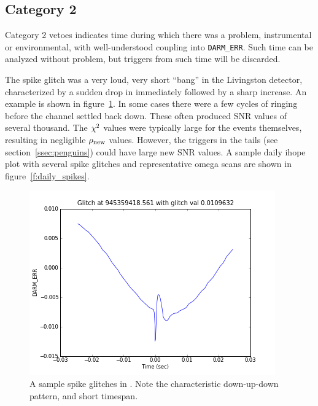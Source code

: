\subsection{Category 2}

Category 2 vetoes indicates time during which there was a problem,
instrumental or environmental, with well-understood coupling into
\texttt{DARM\_ERR}.  Such time can be analyzed without problem, but
triggers from such time will be discarded. 


The spike glitch was a very loud, very short ``bang'' in the
Livingston detector, characterized by a sudden drop in \darmerr
immediately followed by a sharp increase.  An example is shown in
figure~\ref{f:spike_glitch_example}.  In some cases there were a few
cycles of ringing before the channel settled back down.  These often
produced SNR values of several thousand.  The $\chi^2$ values were
typically large for the events themselves, resulting in negligible
$\rho_{\textrm{new}}$ values.  However, the triggers in the tails (see
section~\ref{ssec:penguins}) could have large new SNR values.  A
sample daily ihope plot with several spike glitches and representative
omega scans are shown in figure~\ref{f:daily_spikes}.

\begin{figure}
  \includegraphics[width=\linewidth]{figures/detchar/spike_glitch_example}
  \caption[The spike glitch]{
  \label{f:spike_glitch_example}
A sample spike glitches in \darmerr.  Note the characteristic
down-up-down pattern, and short timespan.}
\end{figure}%

